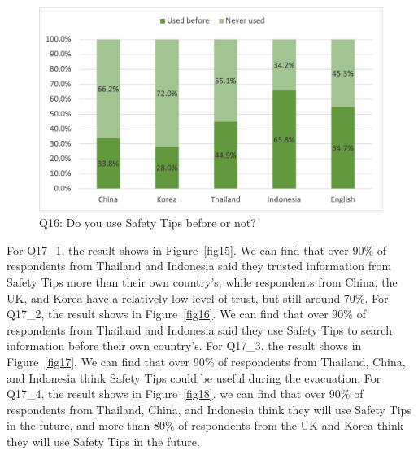 \begin{figure}[h]
  \includegraphics[width=0.6\linewidth]{Figure/Figure14.png}
  \centering
  \caption{Q16: Do you use Safety Tips before or not?}
  \label{fig14}
\end{figure}

For Q17\_1, the result shows in Figure~\ref{fig15}. We can find that over 90\% of respondents from Thailand and Indonesia said they trusted information from Safety Tips more than their own country's, while respondents from China, the UK, and Korea have a relatively low level of trust, but still around 70\%. For Q17\_2, the result shows in Figure~\ref{fig16}. We can find that over 90\% of respondents from Thailand and Indonesia said they use Safety Tips to search information before their own country's. For Q17\_3, the result shows in Figure~\ref{fig17}. We can find that over 90\% of respondents from Thailand, China, and Indonesia think Safety Tips could be useful during the evacuation. For Q17\_4, the result shows in Figure~\ref{fig18}. we can find that over 90\% of respondents from Thailand, China, and Indonesia think they will use Safety Tips in the future, and more than 80\% of respondents from the UK and Korea think they will use Safety Tips in the future.

